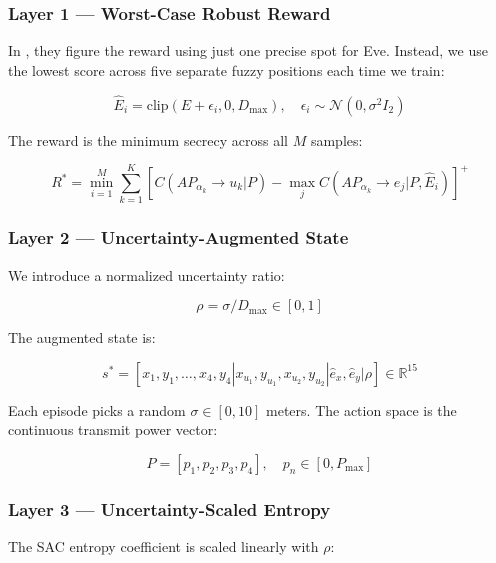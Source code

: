 \documentclass[conference]{IEEEtran}
\begin{document}
\subsubsection{Layer 1 --- Worst-Case Robust Reward}

In \cite{hoseini}, they figure the reward using just one precise spot for Eve. Instead, we use the lowest score across five separate fuzzy positions each time we train:

\begin{equation}
\hat{E}_i=
\text{clip}(E+\epsilon_i,0,D_{\max}),
\quad
\epsilon_i\sim\mathcal{N}(0,\sigma^2I_2)
\end{equation}

The reward is the minimum secrecy across all $M$ samples:

\begin{equation}
R^*=
\min_{i=1}^{M}
\sum_{k=1}^{K}
\left[
C(AP_{\alpha_k}\rightarrow u_k|P)
-
\max_j C(AP_{\alpha_k}\rightarrow e_j|P,\hat{E}_i)
\right]^+
\end{equation}

\subsubsection{Layer 2 --- Uncertainty-Augmented State}

We introduce a normalized uncertainty ratio:

\begin{equation}
\rho=\sigma/D_{\max}\in[0,1]
\end{equation}

The augmented state is:

\begin{equation}
s^*=
[
x_1,y_1,\dots,x_4,y_4
|
x_{u_1},y_{u_1},x_{u_2},y_{u_2}
|
\hat{e}_x,\hat{e}_y
|
\rho
]
\in\mathbb{R}^{15}
\end{equation}

Each episode picks a random $\sigma\in[0,10]$ meters. The action space is the continuous transmit power vector:

\begin{equation}
P=[p_1,p_2,p_3,p_4],
\quad
p_n\in[0,P_{\max}]
\end{equation}

\subsubsection{Layer 3 --- Uncertainty-Scaled Entropy}

The SAC entropy coefficient is scaled linearly with $\rho$:
\end{document}

